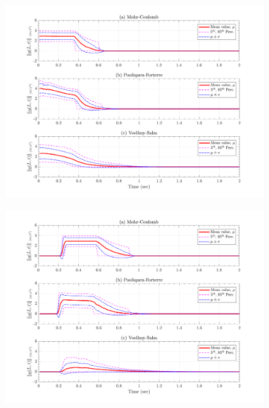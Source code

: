 \documentclass{article}
\begin{document}
\begin{figure}[H]
	\begin{minipage}[b]{0.5\linewidth}
    	\centering
    	\includegraphics[width=1\textwidth]{InclinedPlane/LocalRecords/Records/accel_L1R.png}
    	\label{fig:Ramp-L1-AccR}
	\end{minipage}
	\begin{minipage}[b]{0.5\linewidth}
		\centering
		\includegraphics[width=1\textwidth]{InclinedPlane/LocalRecords/Records/accel_L2R.png}
    	\label{fig:Ramp-L2-AccR}
    \end{minipage}


\end{figure}
\end{document}

